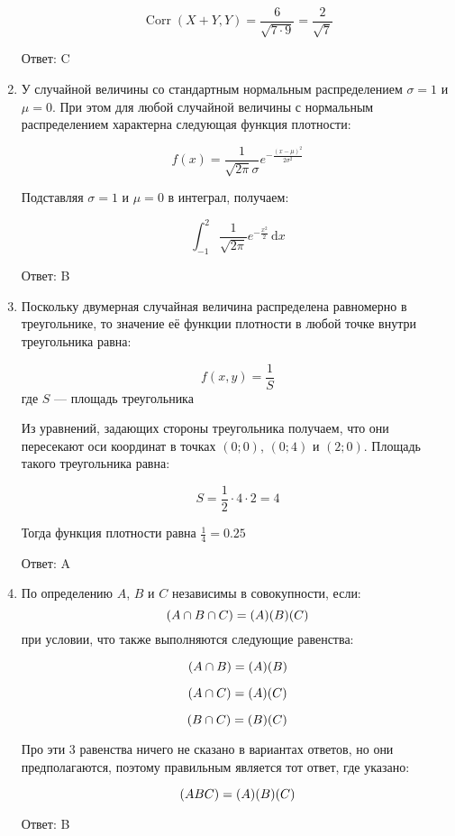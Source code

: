 \documentclass[11pt, a4paper]{article}
\DeclareMathOperator{\Corr}{Corr}
\let\P\relax
\DeclareMathOperator{\P}{\mathbb{P}}
\newcommand{\dx}[1]{\,\mathrm{d}#1} %
\theoremstyle{definition}
\begin{document}
\begin{enumerate}
	\[
	\Corr(X+Y,Y)=\frac{6}{\sqrt{7\cdot9}}=\frac{2}{\sqrt{7}}
	\]
	
	Ответ: C
	
	
	
	\item 
	
	У случайной величины со стандартным нормальным распределением $\sigma=1$ и $\mu=0$. 
	При этом для любой случайной величины с нормальным распределением характерна следующая функция плотности:
	
	\[
	f(x)=\frac{1}{\sqrt{2\pi}\sigma} e^{-\frac{(x-\mu)^2}{2\sigma^2}}
	\]
	
	Подставляя $\sigma=1$ и $\mu=0$ в интеграл, получаем:
	
	\[
	\int_{-1}^{2} \frac{1}{\sqrt{2\pi}} e^{-\frac{x^2}{2}}\dx x
	\]
	
	Ответ: B
	
	
	
	\item 
	
	Поскольку двумерная случайная величина распределена равномерно в треугольнике, то значение её функции плотности в любой точке внутри треугольника равна:
	
	\[
	f(x,y)=\frac{1}{S}
	\]
	где $S$ — площадь треугольника
	
	Из уравнений, задающих стороны треугольника получаем, что они пересекают оси координат в точках $(0;0)$, $(0;4)$ и $(2;0)$. 
	Площадь такого треугольника равна:
	
	\[
	S=\frac{1}{2} \cdot 4 \cdot 2=4 
	\]
	
	Тогда функция плотности равна $\frac{1}{4}=0.25$
	
	Ответ: A
	
	
	\item 
	
	По определению $A$, $B$ и $C$ независимы в совокупности, если: 
	\[
	\P(A\cap B\cap C)=\P(A)\P(B)\P(C)
	\] 
	при условии, что также выполняются следующие равенства:
	
	\[
	\P(A\cap B)=\P(A)\P(B)
	\]
	
	\[
	\P(A\cap C)=\P(A)\P(C)
	\]
	
	\[
	\P(B\cap C)=\P(B)\P(C)
	\]
	
	Про эти 3 равенства ничего не сказано в вариантах ответов, но они предполагаются, поэтому правильным является тот ответ, где указано:
	
	\[
	\P(ABC)=\P(A)\P(B)\P(C)
	\]
	
	Ответ: B
	

\end{enumerate}
\end{document}
